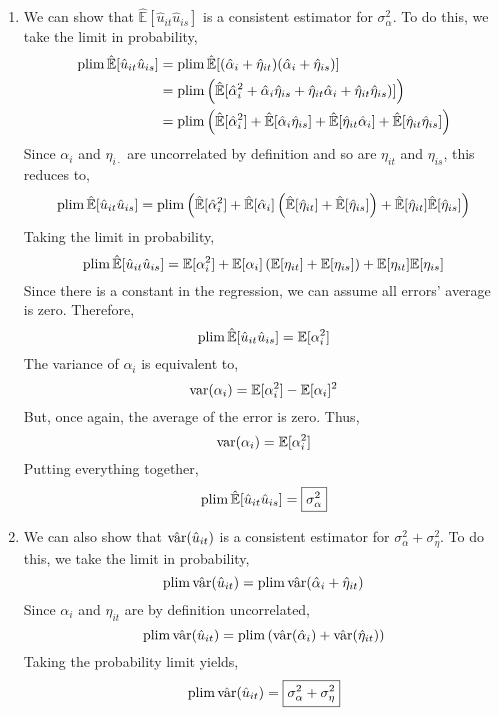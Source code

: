 \documentclass[12pt,twoside]{article}
\begin{document}
\begin{problems}
\begin{problemparts}
\begin{enumerate}[label=\textbf{(\roman*)}]
    \item We can show that $\hat{\mathbb{E}}[\hat{u}_{it} \hat{u}_{is}]$ is a
    consistent estimator for $\sigma_\alpha^2$. To do this, we take the limit
    in probability,
    \begin{align*}
        \operatorname{plim} \hat{\mathbb{E}}[\hat{u}_{it} \hat{u}_{is}] &= \operatorname{plim}
        \hat{\mathbb{E}}[(\hat{\alpha}_i + \hat{\eta}_{it}) (\hat{\alpha}_i +
        \hat{\eta}_{is})] \\
        &= \operatorname{plim} \left(\hat{\mathbb{E}}[\hat{\alpha}_i^2 + \hat{\alpha}_i
        \hat{\eta}_{is} + \hat{\eta}_{it} \hat{\alpha}_i + \hat{\eta}_{it}
        \hat{\eta}_{is})]\right) \\
        &= \operatorname{plim} \left(\hat{\mathbb{E}}[\hat{\alpha}_i^2] +
        \hat{\mathbb{E}}[\hat{\alpha}_i \hat{\eta}_{is}] +
        \hat{\mathbb{E}}[\hat{\eta}_{it} \hat{\alpha}_i] +
        \hat{\mathbb{E}}[\hat{\eta}_{it} \hat{\eta}_{is}]\right) \\
    \end{align*}
    Since $\alpha_i$ and $\eta_{i\cdot}$ are uncorrelated by definition and
    so are $\eta_{it}$ and $\eta_{is}$, this reduces to,
    $$ \operatorname{plim} \hat{\mathbb{E}}[\hat{u}_{it} \hat{u}_{is}]= \operatorname{plim}
    \left(\hat{\mathbb{E}}[\hat{\alpha}_i^2] + \hat{\mathbb{E}}[\hat{\alpha}_i]
    \left(\hat{\mathbb{E}}[\hat{\eta}_{it}] +
    \hat{\mathbb{E}}[\hat{\eta}_{is}]\right) +
    \hat{\mathbb{E}}[\hat{\eta}_{it}] \hat{\mathbb{E}}[\hat{\eta}_{is}]\right) $$
    Taking the limit in probability,
    $$ \operatorname{plim} \hat{\mathbb{E}}[\hat{u}_{it} \hat{u}_{is}]=
    \mathbb{E}[\alpha_i^2] + \mathbb{E}[\alpha_i] \left(\mathbb{E}[\eta_{it}]
    + \mathbb{E}[\eta_{is}]\right) + \mathbb{E}[\eta_{it}]
    \mathbb{E}[\eta_{is}] $$
    Since there is a constant in the regression, we can assume all errors'
    average is zero. Therefore,
    $$ \operatorname{plim} \hat{\mathbb{E}}[\hat{u}_{it} \hat{u}_{is}]=
    \mathbb{E}[\alpha_i^2] $$
    The variance of $\alpha_i$ is equivalent to,
    $$ \operatorname{var}(\alpha_i) = \mathbb{E}[\alpha_i^2] - \mathbb{E}[\alpha_i]^2 $$
    But, once again, the average of the error is zero. Thus,
    $$ \operatorname{var}(\alpha_i) = \mathbb{E}[\alpha_i^2] $$
    Putting everything together,
    $$ \operatorname{plim} \hat{\mathbb{E}}[\hat{u}_{it} \hat{u}_{is}]= \boxed{\sigma_\alpha^2} $$

    \item We can also show that $\hat{\operatorname{var}}(\hat{u}_{it})$ is a consistent
    estimator for $\sigma_\alpha^2 + \sigma_\eta^2$. To do this, we take the
    limit in probability,
    $$ \operatorname{plim} \hat{\operatorname{var}}(\hat{u}_{it}) = \operatorname{plim} \hat{\operatorname{var}}(\hat{\alpha}_i +
    \hat{\eta}_{it}) $$
    Since $\alpha_i$ and $\eta_{it}$ are by definition uncorrelated,
    $$ \operatorname{plim} \hat{\operatorname{var}}(\hat{u}_{it}) = \operatorname{plim}
    \left(\hat{\operatorname{var}}(\hat{\alpha}_i) + \hat{\operatorname{var}}(\hat{\eta}_{it})\right) $$
    Taking the probability limit yields,
    $$ \operatorname{plim} \hat{\operatorname{var}}(\hat{u}_{it}) = \boxed{\sigma_\alpha^2 + \sigma_\eta^2} $$


\end{enumerate}
\end{problemparts}
\end{problems}
\end{document}
